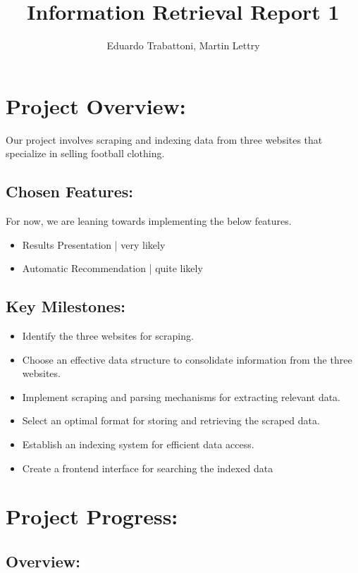 \documentclass[unicode,11pt,a4paper,oneside,numbers=endperiod,openany]{scrartcl}
\title{Information Retrieval Report 1}
\author{Eduardo Trabattoni, Martin Lettry}
\begin{document}
\section*{Project Overview:}

Our project involves scraping and indexing data from three websites that specialize in selling football clothing.

\subsection*{Chosen Features:}

For now, we are leaning towards implementing the below features.

\begin{itemize}
    \item Results Presentation | very likely
    \item Automatic Recommendation | quite likely
\end{itemize}

\subsection*{Key Milestones:}

\begin{itemize}
    \item Identify the three websites for scraping.
    \item Choose an effective data structure to consolidate information from the three websites.
    \item Implement scraping and parsing mechanisms for extracting relevant data.
    \item Select an optimal format for storing and retrieving the scraped data.
    \item Establish an indexing system for efficient data access.
    \item Create a frontend interface for searching the indexed data
\end{itemize}


\section*{Project Progress:}


\subsection*{Overview:}
\end{document}
